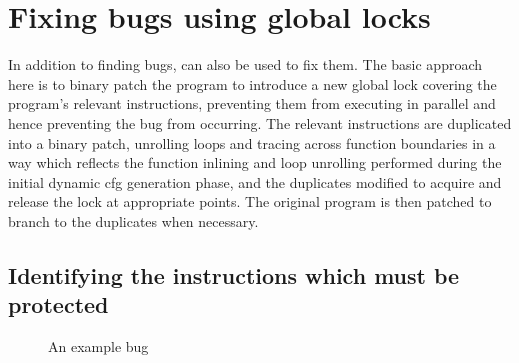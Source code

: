 \chapter{Fixing bugs using global locks}
\label{sect:fix_global_lock}

In addition to finding bugs, {\technique} can also be used to fix
them.  The basic approach here is to binary patch the program to
introduce a new global lock covering the program's relevant
instructions, preventing them from executing in parallel and hence
preventing the bug from occurring.  The relevant instructions are
duplicated into a binary patch, unrolling loops and tracing across
function boundaries in a way which reflects the function inlining and
loop unrolling performed during the initial dynamic \gls{cfg}
generation phase, and the duplicates modified to acquire and release
the lock at appropriate points.  The original program is then patched
to branch to the duplicates when necessary.

\section{Identifying the instructions which must be protected}

\begin{figure}
  \hspace{-5mm}
  \hspace{-10mm}
  \caption{An example bug}
  \label{fig:fix_bug:complex_local}
\end{figure}

